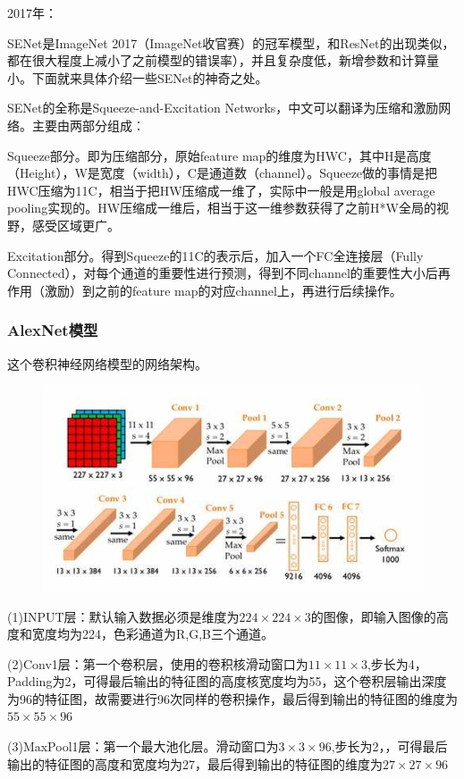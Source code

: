 \documentclass[openbib]{article}
\begin{document}
2017年：

SENet是ImageNet 2017（ImageNet收官赛）的冠军模型，和ResNet的出现类似，都在很大程度上减小了之前模型的错误率），并且复杂度低，新增参数和计算量小。下面就来具体介绍一些SENet的神奇之处。

SENet的全称是Squeeze-and-Excitation Networks，中文可以翻译为压缩和激励网络。主要由两部分组成：

Squeeze部分。即为压缩部分，原始feature map的维度为HWC，其中H是高度（Height），W是宽度（width），C是通道数（channel）。Squeeze做的事情是把HWC压缩为11C，相当于把HW压缩成一维了，实际中一般是用global average pooling实现的。HW压缩成一维后，相当于这一维参数获得了之前H*W全局的视野，感受区域更广。

Excitation部分。得到Squeeze的11C的表示后，加入一个FC全连接层（Fully Connected），对每个通道的重要性进行预测，得到不同channel的重要性大小后再作用（激励）到之前的feature map的对应channel上，再进行后续操作。
\subsubsection{AlexNet模型}

这个卷积神经网络模型的网络架构。
\begin{figure}[htbp]
	\centering
	\includegraphics[scale=0.5]{AlexNet}
\end{figure}

(1)INPUT层：默认输入数据必须是维度为$224\times224\times3$的图像，即输入图像的高度和宽度均为224，色彩通道为R,G,B三个通道。

(2)Conv1层：第一个卷积层，使用的卷积核滑动窗口为$11\times11\times3$,步长为4，Padding为2，可得最后输出的特征图的高度核宽度均为55，这个卷积层输出深度为96的特征图，故需要进行96次同样的卷积操作，最后得到输出的特征图的维度为$55\times55\times96$

(3)MaxPool1层：第一个最大池化层。滑动窗口为$3\times3\times96$,步长为2，，可得最后输出的特征图的高度和宽度均为27，最后得到输出的特征图的维度为$27\times27\times96$
\end{document}
